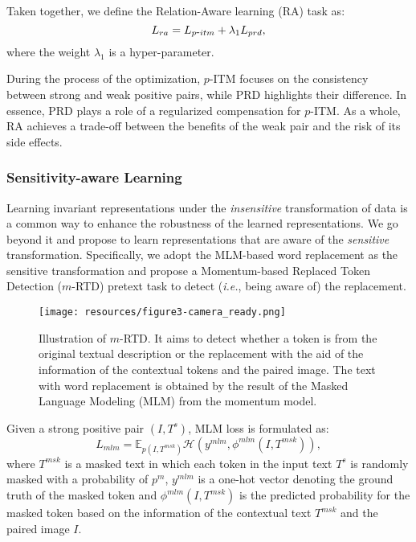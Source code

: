 \documentclass{article}
\begin{document}
Taken together, we define the Relation-Aware learning (RA) task as:
\begin{equation}
    L_{ra} = L_{p\raisebox{0mm}{-}itm} + \lambda_1L_{prd}, \label{equ3}
\end{equation}
where the weight $\lambda_1$ is a hyper-parameter.

During the process of the optimization, $p$-ITM focuses on the consistency between strong and weak positive pairs, while PRD highlights their difference.
In essence, PRD plays a role of a regularized compensation for $p$-ITM. 
As a whole, RA achieves a trade-off between the benefits of the weak pair and the risk of its side effects.

\subsubsection{Sensitivity-aware Learning}
Learning invariant representations under the \emph{insensitive} transformation of data is a common way to enhance the robustness of the learned representations.
We go beyond it and propose to learn representations that are aware of the \emph{sensitive} transformation.
Specifically, we adopt the MLM-based word replacement as the sensitive transformation and propose a Momentum-based Replaced Token Detection ($m$-RTD) pretext task to detect (\emph{i.e.}, being aware of) the replacement.

\begin{figure}[t]
\centering
\texttt{[image: resources/figure3-camera\_ready.png]} \caption{Illustration of $m$-RTD. It aims to detect whether a token is from the original textual description or the replacement with the aid of the information of the contextual tokens and the paired image. The text with word replacement is obtained by the result of the Masked Language Modeling (MLM) from the momentum model.}
\label{fig3}
\end{figure}

Given a strong positive pair $(I, T^s)$, MLM loss is formulated as:
\begin{equation}
    L_{mlm} = \mathbb{E}_{p(I, T^{msk})}{\mathcal{H}}(y^{mlm}, \phi^{mlm}(I, T^{msk})), \label{equ4}
\end{equation}
where $T^{msk}$ is a masked text in which each token in the input text $T^s$ is randomly masked with a probability of $p^{m}$, $y^{mlm}$ is a one-hot vector denoting the ground truth of the masked token and $\phi^{mlm}(I, T^{msk})$ is the predicted probability for the masked token based on the information of the contextual text $T^{msk}$ and the paired image $I$. 
\end{document}
